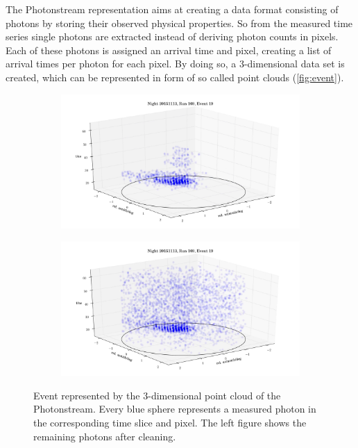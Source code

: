 The Photonstream representation aims at creating a data format consisting of photons by storing their observed physical properties. So from the measured time series single photons are extracted instead of deriving photon counts in pixels. Each of these photons is assigned an arrival time and pixel, creating a list of arrival times per photon for each pixel. By doing so, a 3-dimensional data set is created, which can be represented in form of so called point clouds (\autoref{fig:event}).
%
\begin{figure}
  \begin{subfigure}{0.475\textwidth}
    \includegraphics[width=1.1\textwidth]{Plots/event1.png}
  \end{subfigure}
  \begin{subfigure}{0.475\textwidth}
    \includegraphics[width=1.1\textwidth]{Plots/event2.png}
  \end{subfigure}
  \caption{Event represented by the 3-dimensional point cloud of the Photonstream. Every blue sphere represents a measured photon in the corresponding time slice and pixel. The left figure shows the remaining photons after cleaning.}
  \label{fig:event}
\end{figure}

